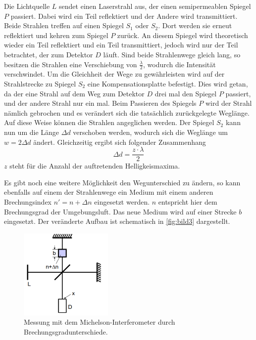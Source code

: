 Die Lichtquelle $L$ sendet einen Laserstrahl aus, der einen semipermeablen Spiegel $P$ passiert. Dabei wird ein Teil reflektiert und der Andere wird transmittiert.
Beide Strahlen treffen auf einen Spiegel $S_\text{1}$ oder $S_\text{2}$.
Dort werden sie erneut reflektiert und kehren zum Spiegel $P$ zurück. An diesem Spiegel wird theoretisch wieder ein Teil reflektiert und ein Teil transmittiert, jedoch wird nur der Teil betrachtet, der zum Detektor $D$ läuft.
Sind beide Strahlenwege gleich lang, so besitzen die Strahlen eine Verschiebung von $\frac{\lambda}{2}$, wodurch die Intensität verschwindet.
Um die Gleichheit der Wege zu gewährleisten wird auf der Strahlstrecke zu Spiegel $S_\text{2}$ eine Kompensationsplatte befestigt.
Dies wird getan, da der eine Strahl auf dem Weg zum Detektor $D$ drei mal den Spiegel $P$ passiert, und der andere Strahl nur ein mal. 
Beim Passieren des Spiegels $P$ wird der Strahl nämlich gebrochen und es verändert sich die tatsächlich zurückgelegte Weglänge.
Auf diese Weise können die Strahlen angeglichen werden.
Der Spiegel $S_\text{2}$ kann nun um die Länge $\Delta d$ verschoben werden, wodurch sich die Weglänge um $w = 2\Delta d$ ändert.
Gleichzeitig ergibt sich folgender Zusammenhang
\begin{equation}
    \Delta d = \frac{z \cdot \lambda}{2}
    \label{eq:welle}
\end{equation}
$z$ steht für die Anzahl der auftretenden Helligkeismaxima.

Es gibt noch eine weitere Möglichkeit den Wegunterschied zu ändern, so kann ebenfalls auf einem der Strahlenwege ein Medium mit einem anderen Brechungsindex $n' = n + \Delta n$ eingesetzt werden. 
$n$ entspricht hier dem Brechungsgrad der Umgebungsluft.
Das neue Medium wird auf einer Strecke $b$ eingesetzt. 
Der veränderte Aufbau ist schematisch in \autoref{fig:bild3} dargestellt.

\begin{figure}
    \centering
    \includegraphics[width=0.4\textwidth]{images/bild3.png}
    \caption{Messung mit dem Michelson-Interferometer durch Brechungsgradunterschiede.\cite{V401}}
    \label{fig:bild3}
\end{figure}

